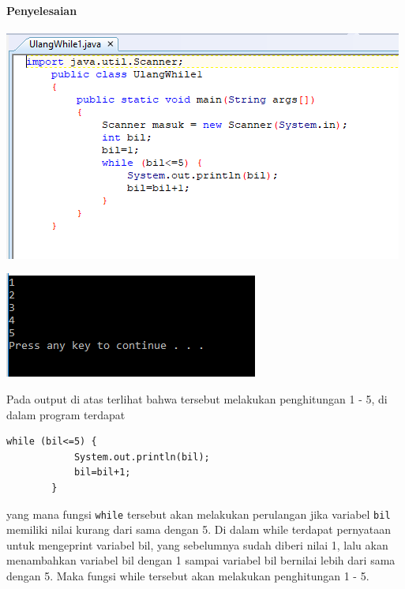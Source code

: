 \documentclass[a4paper,12pt]{article}
\begin{document}
\paragraph{Penyelesaian\\}
\begin{center}
\includegraphics[width=\linewidth]{Capture1}\\
\end{center}
\newpage
\begin{center}
 \includegraphics[scale=1]{Capture2}
\end{center}
Pada output di atas terlihat bahwa tersebut melakukan penghitungan 1 - 5, di dalam program terdapat
\begin{lstlisting}
while (bil<=5) {
            System.out.println(bil);
            bil=bil+1;
        }
\end{lstlisting}
yang mana fungsi \texttt{while} tersebut akan melakukan perulangan jika variabel \texttt{bil} memiliki nilai kurang dari sama dengan 5. Di dalam while terdapat pernyataan untuk mengeprint variabel bil, yang sebelumnya sudah diberi nilai 1, lalu akan menambahkan variabel bil dengan 1 sampai variabel bil bernilai lebih dari sama dengan 5. Maka fungsi while tersebut akan melakukan penghitungan 1 - 5.
\end{document}
